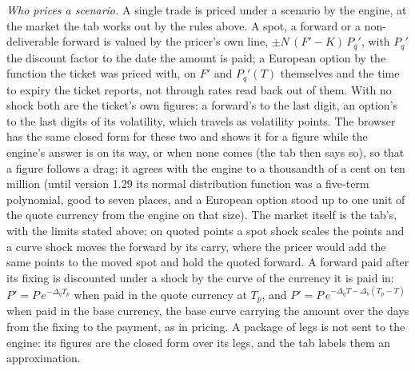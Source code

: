 \documentclass[11pt,a4paper]{article}
\begin{document}
\emph{Who prices a scenario.} A single trade is priced under a scenario by the engine, at the market the tab works out by the rules above. A spot, a forward or a non-deliverable forward is valued by the pricer's own line, $\pm N\,(F'-K)\,P_q'$, with $P_q'$ the discount factor to the date the amount is paid; a European option by the function the ticket was priced with, on $F'$ and $P_q'(T)$ themselves and the time to expiry the ticket reports, not through rates read back out of them. With no shock both are the ticket's own figures: a forward's to the last digit, an option's to the last digits of its volatility, which travels as volatility points. The browser has the same closed form for these two and shows it for a figure while the engine's answer is on its way, or when none comes (the tab then says so), so that a figure follows a drag; it agrees with the engine to a thousandth of a cent on ten million (until version 1.29 its normal distribution function was a five-term polynomial, good to seven places, and a European option stood up to one unit of the quote currency from the engine on that size). The market itself is the tab's, with the limits stated above: on quoted points a spot shock scales the points and a curve shock moves the forward by its carry, where the pricer would add the same points to the moved spot and hold the quoted forward. A forward paid after its fixing is discounted under a shock by the curve of the currency it is paid in: $P'=P\,e^{-\Delta_q T_p}$ when paid in the quote currency at $T_p$, and $P'=P\,e^{-\Delta_q T-\Delta_b (T_p-T)}$ when paid in the base currency, the base curve carrying the amount over the days from the fixing to the payment, as in pricing. A package of legs is not sent to the engine: its figures are the closed form over its legs, and the tab labels them an approximation.
\end{document}
